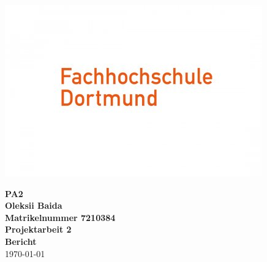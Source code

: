 \begin{titlepage}
  \includegraphics[width = 0.25\pdfpagewidth]{./Bilder/FHDO.jpg}
  \begin{center}
    
    \huge \textbf{\textsf{PA2}} \\
    \vspace{3cm}
    \large \textbf{Oleksii Baida}\\
    \textbf{Matrikelnummer 7210384}\\
    \vspace{3cm}
    \large \textbf{Projektarbeit 2}\\
    \vspace{1cm}
    \large \textbf{Bericht}\\
    \vspace{1cm}
    \today
  \end{center}
\end{titlepage}